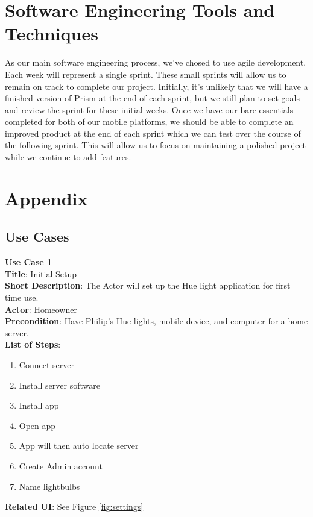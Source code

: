 \documentclass[12pt]{article}
\begin{document}
\section{Software Engineering Tools and Techniques}
As our main software engineering process, we've chosed to use agile development. Each week will represent a single sprint. These small sprints will allow us to remain on track to complete our project. Initially, it's unlikely that we will have a finished version of Prism at the end of each sprint, but we still plan to set goals and review the sprint for these initial weeks. Once we have our bare essentials completed for both of our mobile platforms, we should be able to complete an improved product at the end of each sprint which we can test over the course of the following sprint. This will allow us to focus on maintaining a polished project while we continue to add features.

\clearpage



\section{Appendix}
\setcounter{figure}{0}
  \subsection{Use Cases}
  \begin{samepage}
  \begin{framed}
    \textbf{Use Case 1}\\
    \textbf{Title}: Initial Setup\\
    \textbf{Short Description}:  The Actor will set up the Hue light application for first time use.  \\
    \textbf{Actor}: Homeowner \\
    \textbf{Precondition}: Have Philip's Hue lights, mobile device, and computer for a home server. \\
    \textbf{List of Steps}:
    \begin{enumerate}
      \item Connect server
      \item Install server software
      \item Install app
      \item Open app
      \item App will then auto locate server
      \item Create Admin account
      \item Name lightbulbs
    \end{enumerate}
    \textbf{Related UI}: See Figure \ref{fig:settings} 
  \end{framed}
\end{samepage}
\end{document}
